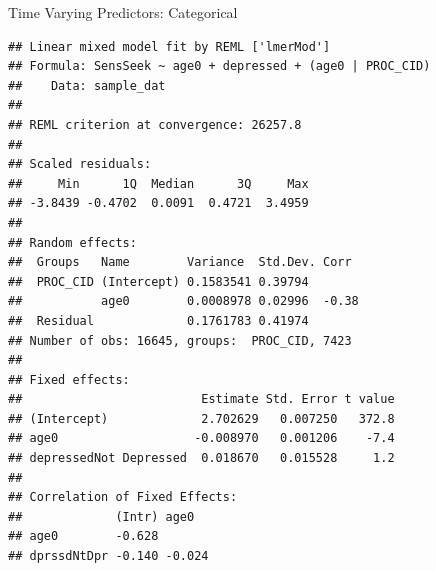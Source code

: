 \begin{frame}[fragile]{Time Varying Predictors: Categorical}

\small

\begin{Shaded}
\end{Shaded}

\tiny

\begin{verbatim}
## Linear mixed model fit by REML ['lmerMod']
## Formula: SensSeek ~ age0 + depressed + (age0 | PROC_CID)
##    Data: sample_dat
## 
## REML criterion at convergence: 26257.8
## 
## Scaled residuals: 
##     Min      1Q  Median      3Q     Max 
## -3.8439 -0.4702  0.0091  0.4721  3.4959 
## 
## Random effects:
##  Groups   Name        Variance  Std.Dev. Corr 
##  PROC_CID (Intercept) 0.1583541 0.39794       
##           age0        0.0008978 0.02996  -0.38
##  Residual             0.1761783 0.41974       
## Number of obs: 16645, groups:  PROC_CID, 7423
## 
## Fixed effects:
##                         Estimate Std. Error t value
## (Intercept)             2.702629   0.007250   372.8
## age0                   -0.008970   0.001206    -7.4
## depressedNot Depressed  0.018670   0.015528     1.2
## 
## Correlation of Fixed Effects:
##             (Intr) age0  
## age0        -0.628       
## dprssdNtDpr -0.140 -0.024
\end{verbatim}

\normalsize

\end{frame}

